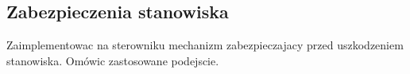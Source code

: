 \subsection{Zabezpieczenia stanowiska}
\label{lab:zad8}


%    

Zaimplementowac na sterowniku mechanizm zabezpieczajacy przed uszkodzeniem stanowiska.
Omówic zastosowane podejscie.

\newpage
